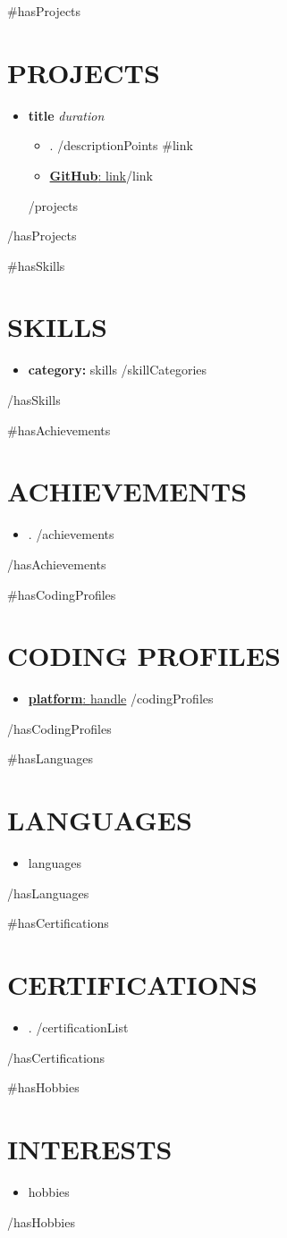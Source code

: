 \documentclass[a4paper,11pt]{article}
\newenvironment{bolditemize}
  {\begin{itemize}[noitemsep, itemsep=0.4em, leftmargin=*]
   \renewcommand{\labelitemi}{\normalfont\bfseries\textbullet}
   \setlength{\labelsep}{0.5em}}
  {\end{itemize}}
\newenvironment{subitemize}
  {\begin{itemize}[noitemsep, itemsep=0.3em, leftmargin=1.5em]
   \renewcommand{\labelitemi}{\normalfont--}
   \setlength{\labelsep}{0.5em}}
  {\end{itemize}}
\begin{document}
{{#hasProjects}}
\section*{PROJECTS}
\begin{bolditemize}
{{#projects}}
    \item \textbf{{{title}}} \hfill \textit{{{duration}}}
    \begin{subitemize}
        {{#descriptionPoints}}
        \item {{.}}
        {{/descriptionPoints}}
        {{#link}}\item \href{{{link}}}{\textbf{GitHub}: {{link}}}{{/link}}
    \end{subitemize}
{{/projects}}
\end{bolditemize}
{{/hasProjects}}

{{#hasSkills}}
\section*{SKILLS}
\begin{bolditemize}
{{#skillCategories}}
    \item \textbf{{{category}}:} {{skills}}
{{/skillCategories}}
\end{bolditemize}
{{/hasSkills}}

{{#hasAchievements}}
\section*{ACHIEVEMENTS}
\begin{bolditemize}
{{#achievements}}
    \item {{.}}
{{/achievements}}
\end{bolditemize}
{{/hasAchievements}}

{{#hasCodingProfiles}}
\section*{CODING PROFILES}
\begin{bolditemize}
{{#codingProfiles}}
    \item \href{{{url}}}{\textbf{{{platform}}}: {{handle}}}
{{/codingProfiles}}
\end{bolditemize}
{{/hasCodingProfiles}}

{{#hasLanguages}}
\section*{LANGUAGES}
\begin{bolditemize}
    \item {{languages}}
\end{bolditemize}
{{/hasLanguages}}

{{#hasCertifications}}
\section*{CERTIFICATIONS}
\begin{bolditemize}
{{#certificationList}}
    \item {{.}}
{{/certificationList}}
\end{bolditemize}
{{/hasCertifications}}

{{#hasHobbies}}
\section*{INTERESTS}
\begin{bolditemize}
    \item {{hobbies}}
\end{bolditemize}
{{/hasHobbies}}
\end{document}
